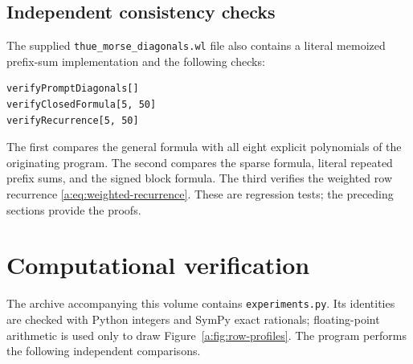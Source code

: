 \documentclass[11pt,a4paper,oneside,openany]{book}
\numberwithin{equation}{chapter}
\theoremstyle{definition}
\theoremstyle{remark}
\begin{document}
\section{Independent consistency checks}

The supplied \texttt{thue\_morse\_diagonals.wl} file also contains a literal
memoized prefix-sum implementation and the following checks:
\begin{lstlisting}[language=Wolfram]
verifyPromptDiagonals[]
verifyClosedFormula[5, 50]
verifyRecurrence[5, 50]
\end{lstlisting}
The first compares the general formula with all eight explicit polynomials of
the originating program.  The second compares the sparse formula, literal repeated prefix
sums, and the signed block formula.  The third verifies the weighted row
recurrence \cref{a:eq:weighted-recurrence}.  These are regression tests; the preceding
sections provide the proofs.
\chapter{Computational verification}\label{ch:verification}

The archive accompanying this volume contains
\texttt{experiments.py}.  Its identities are checked with Python integers and
SymPy exact rationals; floating-point arithmetic is used only to draw
Figure~\ref{a:fig:row-profiles}.  The program performs the following independent
comparisons.
\end{document}
